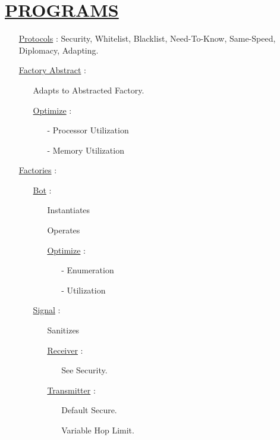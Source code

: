 \documentclass[11pt]{article}
\begin{document}
\section*{\ul{PROGRAMS}}
\begin{enumerate}
	\item[] \ul{Protocols} : Security, Whitelist, Blacklist, Need-To-Know, Same-Speed, Diplomacy, Adapting.
	
	\item[] \ul{Factory Abstract} :
	\begin{enumerate}
		\item[] Adapts to Abstracted Factory.
		\item[] \ul{Optimize}  :
		\begin{enumerate}
			\item[-] Processor Utilization
			\item[-] Memory Utilization
		\end{enumerate}
	\end{enumerate}

	\item[] \ul{Factories} :
	\begin{enumerate}
		
		\item[] \ul{Bot} :
		\begin{enumerate}
			\item[] Instantiates
			\item[] Operates
			\item[] \ul{Optimize}  :
			\begin{enumerate}
				\item[-] Enumeration
				\item[-] Utilization
			\end{enumerate}
		\end{enumerate}

		\item[] \ul{Signal} :
		\begin{enumerate}
			\item[] Sanitizes
			
			\item[] \ul{Receiver}  :
			\begin{enumerate}
				\item[] See Security.
			\end{enumerate}
			
			\item[] \ul{Transmitter}  :
			\begin{enumerate}
				\item[] Default Secure.
				\item[] Variable Hop Limit.
			\end{enumerate}
		

\end{enumerate}
\end{enumerate}
\end{enumerate}
\end{document}
